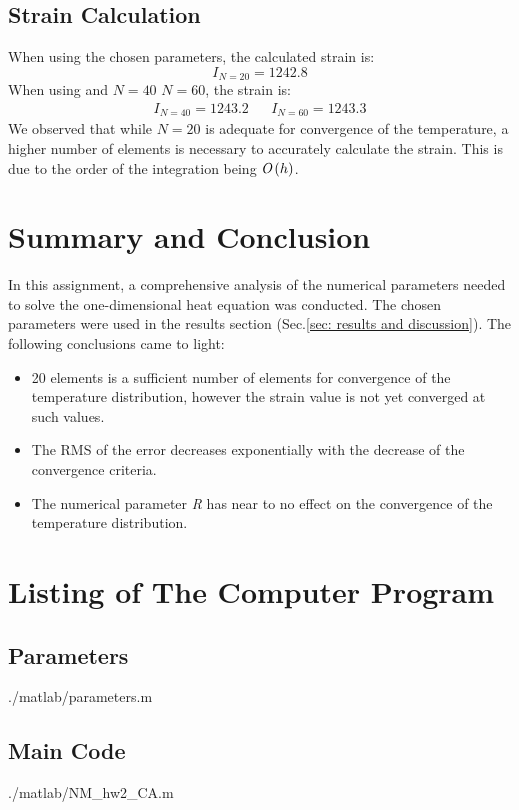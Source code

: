 \documentclass[11pt, a4paper]{article}
\begin{document}
\subsection{Strain Calculation}
When using the chosen parameters, the calculated strain is:
\begin{equation}
    I_{N=20}=1242.8
\end{equation}
When using and $N=40$ $N=60$, the strain is:
\begin{equation}
    \begin{matrix}
        I_{N=40}=1243.2 && I_{N=60}=1243.3
    \end{matrix}
\end{equation}
We observed that while $N = 20$ is adequate for convergence of the temperature, a higher number of elements is necessary to accurately calculate the strain. This is due to the order of the integration being $\emph{O}\left(h\right)$. 

\section{Summary and Conclusion}
In this assignment, a comprehensive analysis of the numerical parameters needed to solve the one-dimensional heat equation was conducted. The chosen parameters were used in the results section (Sec.\ref{sec: results and discussion}). The following conclusions came to light:
\begin{itemize}
    \item 20 elements is a sufficient number of elements for convergence of the temperature distribution, however the strain value is not yet converged at such values.
    \item The RMS of the error decreases exponentially with the decrease of the convergence criteria.
    \item The numerical parameter \emph{R} has near to no effect on the convergence of the temperature distribution.
\end{itemize}

\newpage
\appendix
\section{Listing of The Computer Program}
\subsection{Parameters}
\begin{lstinputlisting}[captionpos=b,stringstyle=\color{magenta},frame=single, numbers=left, style=MatLab-editor, basicstyle=\mlttfamily\small, caption={Parameters file},mlshowsectionrules=true]{./matlab/parameters.m}
\end{lstinputlisting}

\subsection{Main Code}
\begin{lstinputlisting}[captionpos=b,stringstyle=\color{magenta},frame=single, numbers=left, style=MatLab-editor, basicstyle=\mlttfamily\small, caption={The main file},mlshowsectionrules=true]{./matlab/NM_hw2_CA.m}
\end{lstinputlisting}
\end{document}

